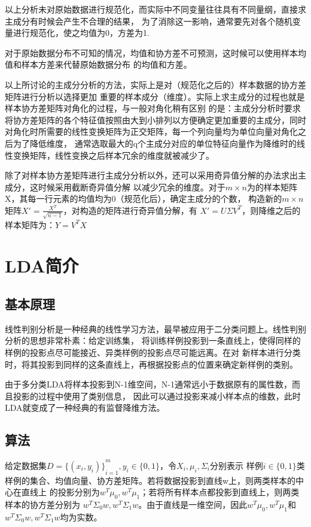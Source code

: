 \documentclass{article}
\begin{document}
以上分析未对原始数据进行规范化，而实际中不同变量往往具有不同量纲，直接求主成分有时候会产生不合理的结果，
为了消除这一影响，通常要先对各个随机变量进行规范化，使之均值为0，方差为1.

对于原始数据分布不可知的情况，均值和协方差不可预测，这时候可以使用样本均值和样本方差来代替原始数据分布
的均值和方差。

以上所讨论的主成分分析的方法，实际上是对（规范化之后的）样本数据的协方差矩阵进行分析以选择更加
重要的样本成分（维度）。实际上求主成分的过程也就是样本协方差矩阵对角化的过程，与一般对角化稍有区别
的是：主成分分析时要求将协方差矩阵的各个特征值按照由大到小排列以方便确定更加重要的主成分，同时
对角化时所需要的线性变换矩阵为正交矩阵，每一个列向量均为单位向量对角化之后为了降低维度，
通常选取最大的q个主成分对应的单位特征向量作为降维时的线性变换矩阵，线性变换之后样本冗余的维度就被减少了。

除了对样本协方差矩阵进行主成分分析以外，还可以采用奇异值分解的办法求出主成分，这时候采用截断奇异值分解
以减少冗余的维度。对于$m \times n$为的样本矩阵X，其每一行元素的均值均为0（规范化后），确定主成分的个数，
构造新的$m \times n$矩阵$X' = \frac{X^T}{\sqrt{n-1}}$，对构造的矩阵进行奇异值分解，有
$X' = U{\Sigma}V^T$，则降维之后的样本矩阵为：$Y=V^TX$

\section{LDA简介}
\subsection{基本原理}
线性判别分析是一种经典的线性学习方法，最早被应用于二分类问题上。线性判别分析的思想非常朴素：给定训练集，
将训练样例投影到一条直线上，使得同样的样例的投影点尽可能接近、异类样例的投影点尽可能远离。在对
新样本进行分类时，将其投影到同样的这条直线上，再根据投影点的位置来确定新样例的类别。

由于多分类LDA将样本投影到N-1维空间，N-1通常远小于数据原有的属性数，而且投影的过程中使用了类别信息，
因此可以通过投影来减小样本点的维数，此时LDA就变成了一种经典的有监督降维方法。

\subsection{算法}
给定数据集$D={\{(x_i, y_i)\}}_{i=1}^m, y_i \in \{0, 1\}$，令$X_i, {\mu}_i, {\Sigma}_i$分别表示
样例$i\in\{0, 1\}$类样例的集合、均值向量、协方差矩阵。若将数据投影到直线w上，则两类样本的中心在直线上
的投影分别为$w^T{\mu}_0, w^T{\mu}_1$；若将所有样本点都投影到直线上，则两类样本的协方差分别为
$w^T{\Sigma}_0w, w^T{\Sigma}_1w$。由于直线是一维空间，因此$w^T{\mu}_0, w^T{\mu}_1$和
$w^T{\Sigma}_0w, w^T{\Sigma}_1w$均为实数。
\end{document}
